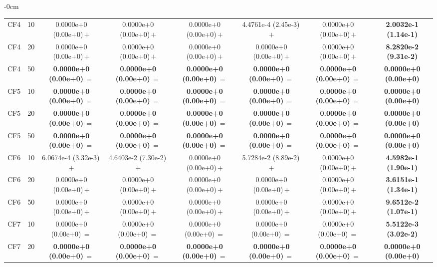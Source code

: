 \begin{table}[!htbp]
\begin{ROneBlock}
\begin{adjustwidth}{-\extralength}{0cm}
\begin{tabular*}{\linewidth}{@{\extracolsep{\fill}}llcccccc@{}}
CF4 & 10 & 0.0000e+0 (0.00e+0)\,$+$ & 0.0000e+0 (0.00e+0)\,$+$ & 0.0000e+0 (0.00e+0)\,$+$ & 4.4761e-4 (2.45e-3)\,$+$ & 0.0000e+0 (0.00e+0)\,$+$ & \textbf{2.0032e-1 (1.14e-1)} \\
CF4 & 20 & 0.0000e+0 (0.00e+0)\,$+$ & 0.0000e+0 (0.00e+0)\,$+$ & 0.0000e+0 (0.00e+0)\,$+$ & 0.0000e+0 (0.00e+0)\,$+$ & 0.0000e+0 (0.00e+0)\,$+$ & \textbf{8.2820e-2 (9.31e-2)} \\
CF4 & 50 & \textbf{0.0000e+0 (0.00e+0)}\,$=$ & \textbf{0.0000e+0 (0.00e+0)}\,$=$ & \textbf{0.0000e+0 (0.00e+0)}\,$=$ & \textbf{0.0000e+0 (0.00e+0)}\,$=$ & \textbf{0.0000e+0 (0.00e+0)}\,$=$ & \textbf{0.0000e+0 (0.00e+0)} \\
CF5 & 10 & \textbf{0.0000e+0 (0.00e+0)}\,$=$ & \textbf{0.0000e+0 (0.00e+0)}\,$=$ & \textbf{0.0000e+0 (0.00e+0)}\,$=$ & \textbf{0.0000e+0 (0.00e+0)}\,$=$ & \textbf{0.0000e+0 (0.00e+0)}\,$=$ & \textbf{0.0000e+0 (0.00e+0)} \\
CF5 & 20 & \textbf{0.0000e+0 (0.00e+0)}\,$=$ & \textbf{0.0000e+0 (0.00e+0)}\,$=$ & \textbf{0.0000e+0 (0.00e+0)}\,$=$ & \textbf{0.0000e+0 (0.00e+0)}\,$=$ & \textbf{0.0000e+0 (0.00e+0)}\,$=$ & \textbf{0.0000e+0 (0.00e+0)} \\
CF5 & 50 & \textbf{0.0000e+0 (0.00e+0)}\,$=$ & \textbf{0.0000e+0 (0.00e+0)}\,$=$ & \textbf{0.0000e+0 (0.00e+0)}\,$=$ & \textbf{0.0000e+0 (0.00e+0)}\,$=$ & \textbf{0.0000e+0 (0.00e+0)}\,$=$ & \textbf{0.0000e+0 (0.00e+0)} \\
CF6 & 10 & 6.0674e-4 (3.32e-3)\,$+$ & 4.6403e-2 (7.30e-2)\,$+$ & 0.0000e+0 (0.00e+0)\,$+$ & 5.7284e-2 (8.89e-2)\,$+$ & 0.0000e+0 (0.00e+0)\,$+$ & \textbf{4.5982e-1 (1.90e-1)} \\
CF6 & 20 & 0.0000e+0 (0.00e+0)\,$+$ & 0.0000e+0 (0.00e+0)\,$+$ & 0.0000e+0 (0.00e+0)\,$+$ & 0.0000e+0 (0.00e+0)\,$+$ & 0.0000e+0 (0.00e+0)\,$+$ & \textbf{3.6151e-1 (1.34e-1)} \\
CF6 & 50 & 0.0000e+0 (0.00e+0)\,$+$ & 0.0000e+0 (0.00e+0)\,$+$ & 0.0000e+0 (0.00e+0)\,$+$ & 0.0000e+0 (0.00e+0)\,$+$ & 0.0000e+0 (0.00e+0)\,$+$ & \textbf{9.6512e-2 (1.07e-1)} \\
CF7 & 10 & 0.0000e+0 (0.00e+0)\,$=$ & 0.0000e+0 (0.00e+0)\,$=$ & 0.0000e+0 (0.00e+0)\,$=$ & 0.0000e+0 (0.00e+0)\,$=$ & 0.0000e+0 (0.00e+0)\,$=$ & \textbf{5.5122e-3 (3.02e-2)} \\
CF7 & 20 & \textbf{0.0000e+0 (0.00e+0)}\,$=$ & \textbf{0.0000e+0 (0.00e+0)}\,$=$ & \textbf{0.0000e+0 (0.00e+0)}\,$=$ & \textbf{0.0000e+0 (0.00e+0)}\,$=$ & \textbf{0.0000e+0 (0.00e+0)}\,$=$ & \textbf{0.0000e+0 (0.00e+0)} \\

\end{tabular*}
\end{adjustwidth}
\end{ROneBlock}
\end{table}
